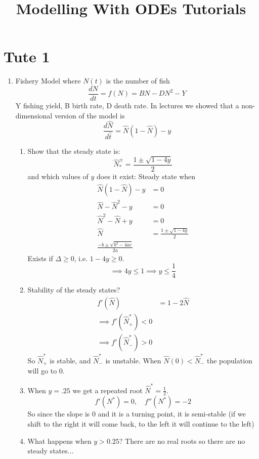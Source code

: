 \documentclass{X:/Documents/Coding/Latex/myassignment}
\title{Modelling With ODEs Tutorials}
\begin{document}
\maketitle

\section{Tute 1}
\begin{enumerate}
    \item Fishery Model where $N(t)$ is the number of fish
    \[\frac{dN}{dt} = f(N) = BN - DN^2 - Y\]
Y fishing yield, B birth rate, D death rate.
In lectures we showed that a non-dimensional version of the model is
\[\frac{d\hat{N}}{d\hat{t}} = \hat{N}(1-\hat{N}) - y\]
\begin{enumerate}
    
    \item Show that the steady state is: 
    \[\hat{N}_*^{\pm} = \frac{1\pm \sqrt{1-4y}}{2}\]
    and which values of $y$ does it exist:
    Steady state when 
    \begin{align*}
        \hat{N}(1-\hat{N}) -y &= 0\\
        \hat{N} - \hat{N}^2 -y &= 0\\
        \hat{N}^2 - \hat{N} + y &= 0\\
        \hat{N} &= \frac{1 \pm \sqrt{1 - 4y}}{2}\\
        \frac{-b \pm \sqrt{b^2 - 4ac}}{2a}
    \end{align*}
    Exists if $\Delta \geq 0$, i.e. $1-4y \geq 0$.
    \[\implies 4y \leq 1 \implies y \leq \frac14\]
    \item Stability of the steady states?
    \begin{align*}
        f'(\hat{N}) &= 1 - 2\hat{N}\\
        \implies f'(\hat{N}^*_+) < 0 \\
        \implies f'(\hat{N}^*_-) > 0 
    \end{align*}
    So $\hat{N}^*_+$ is stable, and $\hat{N}^*_-$ is unstable. When $\hat{N}(0) < \hat{N}^*_-$ the population will go to $0$.
    \item When $y=.25$ we get a repeated root $\hat{N}^* = \frac12$.
    \[f'(N^*) = 0, \quad f''(N^*) = -2\]
    So since the slope is $0$ and it is a turning point, it is semi-stable (if we shift to the right it will come back, to the left it will continue to the left)
    
    \item What happens when $y > 0.25$? There are no real roots so there are no steady states...
    

\end{enumerate}
\end{enumerate}
\end{document}
